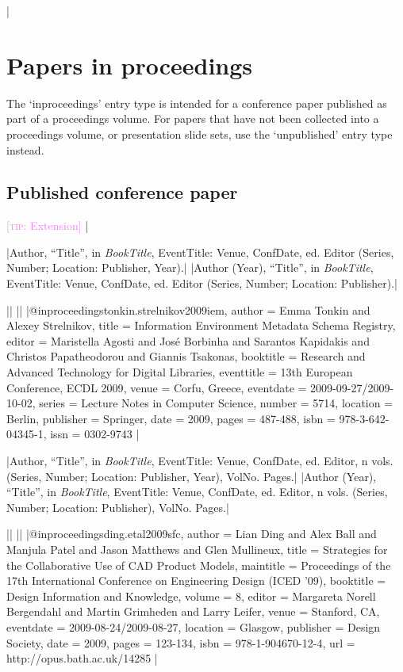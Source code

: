 \documentclass[extrafontsizes,11pt,a4paper,oneside]{memoir}
\newcommand*{\lit}[1]{\textsf{#1}}
\newcommand*{\code}[1]{`\textsf{#1}'}
\newcommand*{\aside}[1]{\textcolor{violet}{[\textsc{tip:} #1]}}
\begin{document}
\todoc|
\chapter{Papers in proceedings}\label{sec:inproceedings}

The \code{inproceedings} entry type is intended for a conference paper published as part of a proceedings volume. For papers that have not been collected into a proceedings volume, or presentation slide sets, use the \code{unpublished} entry type instead.

\section{Published conference paper}
\aside{Extension}
|

\specs
|Author, \enquote{Title}, \lit{in} \emph{BookTitle}, EventTitle: Venue, ConfDate, \lit{ed.} Editor (Series, Number; Location: Publisher, Year).|%
|Author (Year), \enquote{Title}, \lit{in} \emph{BookTitle}, EventTitle: Venue, ConfDate, \lit{ed.} Editor (Series, Number; Location: Publisher).|

\bibexample
||%
||%
|@inproceedings{tonkin.strelnikov2009iem,
  author = {Emma Tonkin and Alexey Strelnikov},
  title = {Information Environment Metadata Schema Registry},
  editor = {Maristella Agosti and José Borbinha and Sarantos Kapidakis and Christos Papatheodorou and Giannis Tsakonas},
  booktitle = {Research and Advanced Technology for Digital Libraries},
  eventtitle = {13th European Conference, ECDL 2009},
  venue = {Corfu, Greece},
  eventdate = {2009-09-27/2009-10-02},
  series = {Lecture Notes in Computer Science},
  number = {5714},
  location = {Berlin},
  publisher = {Springer},
  date = {2009},
  pages = {487-488},
  isbn = {978-3-642-04345-1},
  issn = {0302-9743}
}|

\specs
|Author, \enquote{Title}, \lit{in} \emph{BookTitle}, EventTitle: Venue, ConfDate, \lit{ed.} Editor, n \lit{vols.} (Series, Number; Location: Publisher, Year), VolNo. Pages.|%
|Author (Year), \enquote{Title}, \lit{in} \emph{BookTitle}, EventTitle: Venue, ConfDate, \lit{ed.} Editor, n \lit{vols.} (Series, Number; Location: Publisher), VolNo. Pages.|

\bibexample
||%
||%
|@inproceedings{ding.etal2009sfc,
  author = {Lian Ding and Alex Ball and Manjula Patel and Jason Matthews and Glen Mullineux},
  title = {Strategies for the Collaborative Use of CAD Product Models},
  maintitle = {Proceedings of the 17th International Conference on Engineering Design (ICED ’09)},
  booktitle = {Design Information and Knowledge},
  volume = {8},
  editor = {Margareta Norell Bergendahl and Martin Grimheden and Larry Leifer},
  venue = {Stanford, CA},
  eventdate = {2009-08-24/2009-08-27},
  location = {Glasgow},
  publisher = {Design Society},
  date = {2009},
  pages = {123-134},
  isbn = {978-1-904670-12-4},
  url = {http://opus.bath.ac.uk/14285}
}|
\end{document}
